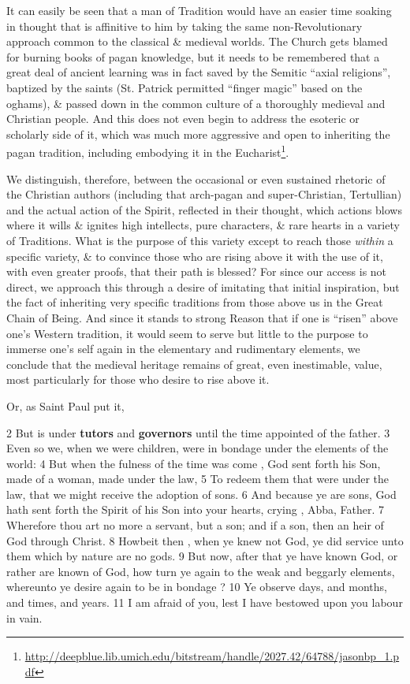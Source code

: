 It can easily be seen that a man of Tradition would have an easier time soaking in thought that is affinitive to him by taking the same non-Revolutionary approach common to the classical \& medieval worlds. The Church gets blamed for burning books of pagan knowledge, but it needs to be remembered that a great deal of ancient learning was in fact saved by the Semitic ``axial religions'', baptized by the saints (St. Patrick permitted ``finger magic'' based on the oghams), \& passed down in the common culture of a thoroughly medieval and Christian people. And this does not even begin to address the esoteric or scholarly side of it, which was much more aggressive and open to inheriting the pagan tradition, including embodying it in the Eucharist\footnote{\url{http://deepblue.lib.umich.edu/bitstream/handle/2027.42/64788/jasonbp_1.pdf}}.

We distinguish, therefore, between the occasional or even sustained rhetoric of the Christian authors (including that arch-pagan and super-Christian, Tertullian) and the actual action of the Spirit, reflected in their thought, which actions blows where it wills \& ignites high intellects, pure characters, \& rare hearts in a variety of Traditions. What is the purpose of this variety except to reach those \emph{within} a specific variety, \& to convince those who are rising above it with the use of it, with even greater proofs, that their path is blessed? For since our access is not direct, we approach this through a desire of imitating that initial inspiration, but the fact of inheriting very specific traditions from those above us in the Great Chain of Being. And since it stands to strong Reason that if one is ``risen'' above one's Western tradition, it would seem to serve but little to the purpose to immerse one's self again in the elementary and rudimentary elements, we conclude that the medieval heritage remains of great, even inestimable, value, most particularly for those who desire to rise above it.

Or, as Saint Paul put it,

\begin{quotex}
2 But is under \textbf{tutors} and \textbf{governors} until the time appointed of the father.  3 Even so we, when we were children, were in bondage under the elements of the world:  4 But when the fulness of the time was come , God sent forth his Son, made of a woman, made under the law, 5 To redeem them that were under the law, that we might receive the adoption of sons. 6 And because ye are sons, God hath sent forth the Spirit of his Son into your hearts, crying , Abba, Father. 7 Wherefore thou art no more a servant, but a son; and if a son, then an heir of God through Christ.  8 Howbeit then , when ye knew not God, ye did service unto them which by nature are no gods. 9 But now, after that ye have known God, or rather are known of God, how turn ye again to the weak and beggarly elements, whereunto ye desire again to be in bondage ?  10 Ye observe days, and months, and times, and years. 11 I am afraid of you, lest I have bestowed upon you labour in vain. 
\end{quotex}



